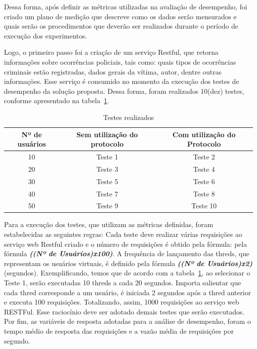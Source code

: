 Dessa forma, após definir as métricas utilizadas na avaliação de desempenho, foi criado um plano de medição que descreve como os dados serão mensurados e quais serão os procedimentos que deverão ser realizados durante o período de execução dos experimentos.

Logo, o primeiro passo foi a criação de um serviço Restful, que retorna informações sobre ocorrências policiais, tais como: quais tipos de ocorrências criminais estão registradas, dados gerais da vítima, autor, dentre outras informações. Esse serviço é consumido  no momento da execução dos testes de desempenho da solução proposta. Dessa forma, foram realizados 10(dez) testes, conforme apresentado na tabela~\ref{tb:tb_testes}.

\begin{table}[h]
\begin{center}
\begin{tabular}{|c|c|c|}
\hline
Nº de usuários & Sem utilização do protocolo & Com utilização do Protocolo \\ \hline
10             & Teste 1                     & Teste 2                     \\ \hline
20             & Teste 3                     & Teste 4                    \\ \hline
30             & Teste 5                     & Teste 6                    \\ \hline
40             & Teste 7                     & Teste 8                    \\ \hline
50             & Teste 9                     & Teste 10                    \\ \hline
\end{tabular}
\caption {Testes realizados}\label{tb:tb_testes}
\end{center}
\end{table}

Para a execução dos testes, que utilizam as métricas definidas, foram estabelecidas as seguintes regras: Cada teste deve realizar várias requisições ao serviço web Restful criado e o número de requisições é obtido pela fórmula: pela fórmula \textbf{\emph{((Nº de Usuários)x100)}}. A frequência de lançamento das threds, que representam os usuários virtuais, é definido pela fórmula \textbf{\emph{((Nº de Usuários)x2)}}(segundos). Exemplificando, temos que de acordo com a tabela~\ref{tb:tb_testes}, ao selecionar o Teste 1, serão executadas 10 threds a cada 20 segundos. Importa salientar que cada thred corresponde a um usuário, é iniciada 2 segundos após a thred anterior e executa 100 requisições. Totalizando, assim, 1000 requisições ao serviço web RESTFul. Esse raciocínio deve ser adotado demais testes que serão executados. Por fim, as variáveis de resposta adotadas para a análise de desempenho, foram o tempo médio de resposta das requisições e a vazão média de requisições por segundo.

